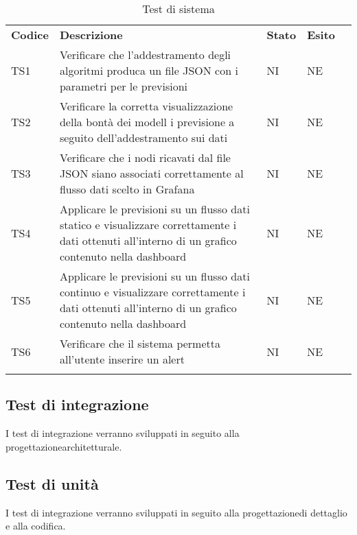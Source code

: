 \begin{longtable} {
		>{}p{15mm} 
		>{}p{79.5mm}
		>{}p{15mm} 
		>{}p{15mm}
		>{}p{0mm}}
	\rowcolor{gray!50}
	\textbf{Codice} & \textbf{Descrizione} & \textbf{Stato} & \textbf{Esito} &\TBstrut \\
	TS1 & Verificare che l'addestramento degli algoritmi produca un file JSON con i parametri per le previsioni & NI & NE  &\TBstrut \\ [2mm]
	TS2 & Verificare la corretta visualizzazione della bontà dei modell	i previsione a seguito dell'addestramento sui dati & NI & NE  &\TBstrut \\ [2mm]
	TS3 & Verificare che i nodi ricavati dal file JSON siano associati correttamente al flusso dati scelto in Grafana\glo & NI & NE  &\TBstrut \\ [2mm]
	TS4 & Applicare le previsioni su un flusso dati statico e visualizzare correttamente i dati ottenuti all'interno di un grafico contenuto nella dashboard\glo & NI & NE  &\TBstrut \\ [2mm]
	TS5 & Applicare le previsioni su un flusso dati continuo e visualizzare correttamente i dati ottenuti all'interno di un grafico contenuto nella dashboard\glo & NI & NE  &\TBstrut \\ [2mm]
	TS6 & Verificare che il sistema permetta all'utente inserire un alert\glo & NI & NE  &\TBstrut \\ [2mm]
	\rowcolor{white}
	\caption{Test di sistema}
\end{longtable}


\subsection{Test di integrazione}
I test di integrazione verranno sviluppati in seguito alla progettazione\glosp architetturale.

\subsection{Test di unità}
I test di integrazione verranno sviluppati in seguito alla progettazione\glosp di dettaglio e alla codifica.
